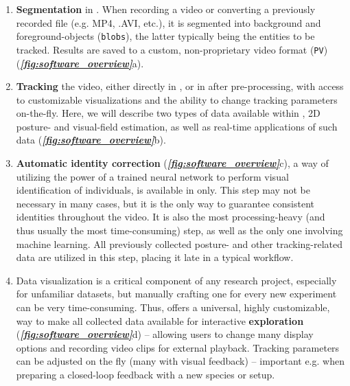 \documentclass[9pt,lineno]{elife}
\newcommand{\figref}[1]{\textit{\textbf{\ref{#1}}}}
\newcommand{\TRex}{\protect\path{TRex}}
\newcommand{\TGrabs}{\protect\path{TGrabs}}
\begin{document}
\begin{enumerate}
    \item \textbf{Segmentation} in \TGrabs{}. When recording a video or converting a previously recorded file (e.g. MP4, .AVI, etc.), it is segmented into background and foreground-objects (\verb!blobs!), the latter typically being the entities to be tracked. Results are saved to a custom, non-proprietary video format (\verb!PV!)  (\figref{fig:software_overview}a).
    \item \textbf{Tracking} the video, either directly in \TGrabs{}, or {\color{blue} in \TRex{} after pre-processing,} with access to customizable visualizations and the ability to change tracking parameters on-the-fly. Here, we will describe two types of data available within \TRex{}, 2D posture- and visual-field estimation, as well as real-time applications of such data  (\figref{fig:software_overview}b).
    \item {\color{blue}\textbf{Automatic identity correction} (\figref{fig:software_overview}c), a way of utilizing the power of a trained neural network to perform visual identification of individuals, is available in \TRex{} only.} This step may not be necessary in many cases, but it is the only way to guarantee consistent identities throughout the video. It is also the {\color{blue}most processing-heavy (and thus usually the most time-consuming)} step, as well as the only one involving machine learning. All previously collected posture- and other tracking-related data are utilized in this step, placing it late in a typical workflow.
    \item Data visualization is a critical component of any research project, especially for unfamiliar datasets, but manually crafting one for every new experiment can be very time-consuming. Thus, \TRex{} offers a universal, highly customizable, way to make all collected data available for interactive \textbf{exploration} (\figref{fig:software_overview}d) -- allowing users to change many display options and recording video clips for external playback. Tracking parameters can be adjusted on the fly (many with visual feedback) -- important e.g. when preparing a closed-loop feedback with a new species or setup.
\end{enumerate}
\end{document}
